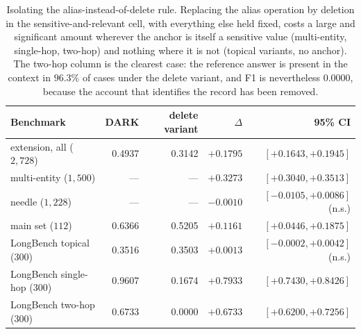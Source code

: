 \begin{table}[t]
\caption{Isolating the alias-instead-of-delete rule. Replacing the alias operation by
deletion in the sensitive-and-relevant cell, with everything else held fixed, costs a large
and significant amount wherever the anchor is itself a sensitive value (multi-entity,
single-hop, two-hop) and nothing where it is not (topical variants, no anchor). The
two-hop column is the clearest case: the reference answer is present in the context in
$96.3\%$ of cases under the delete variant, and F1 is nevertheless $0.0000$, because the
account that identifies the record has been removed.}
\label{tab:ablation_alias}
\centering\small
\setlength{\tabcolsep}{6pt}
\begin{tabular}{lrrrr}
\toprule
Benchmark & \textsc{DARK} & delete variant & $\Delta$ & 95\% CI \\
\midrule
extension, all ($2{,}728$)     & 0.4937 & 0.3142 & $+0.1795$ & $[+0.1643,+0.1945]$ \\
\quad multi-entity ($1{,}500$) & ---    & ---    & $+0.3273$ & $[+0.3040,+0.3513]$ \\
\quad needle ($1{,}228$)       & ---    & ---    & $-0.0010$ & $[-0.0105,+0.0086]$ (n.s.) \\
main set ($112$)               & 0.6366 & 0.5205 & $+0.1161$ & $[+0.0446,+0.1875]$ \\
LongBench topical ($300$)      & 0.3516 & 0.3503 & $+0.0013$ & $[-0.0002,+0.0042]$ (n.s.) \\
LongBench single-hop ($300$)   & 0.9607 & 0.1674 & $+0.7933$ & $[+0.7430,+0.8426]$ \\
LongBench two-hop ($300$)      & 0.6733 & 0.0000 & $+0.6733$ & $[+0.6200,+0.7256]$ \\
\bottomrule
\end{tabular}
\end{table}
